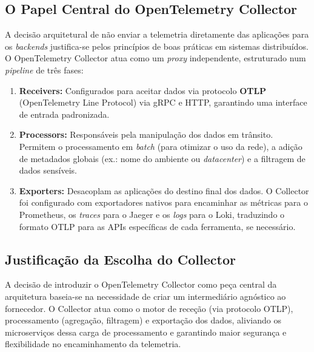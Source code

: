 \documentclass[a4paper,12pt,oneside]{article}
\begin{document}
    \subsection{O Papel Central do OpenTelemetry Collector}
        A decisão arquitetural de não enviar a telemetria diretamente das aplicações para os \textit{backends} justifica-se pelos princípios de boas práticas em sistemas distribuídos. O OpenTelemetry Collector atua como um \textit{proxy} independente, estruturado num \textit{pipeline} de três fases:
        \begin{enumerate}
            \item \textbf{Receivers:} Configurados para aceitar dados via protocolo \textbf{OTLP} (OpenTelemetry Line Protocol) via gRPC e HTTP, garantindo uma interface de entrada padronizada.
            \item \textbf{Processors:} Responsáveis pela manipulação dos dados em trânsito. Permitem o processamento em \textit{batch} (para otimizar o uso da rede), a adição de metadados globais (ex.: nome do ambiente ou \textit{datacenter}) e a filtragem de dados sensíveis.
            \item \textbf{Exporters:} Desacoplam as aplicações do destino final dos dados. O Collector foi configurado com exportadores nativos para encaminhar as métricas para o Prometheus, os \textit{traces} para o Jaeger e os \textit{logs} para o Loki, traduzindo o formato OTLP para as APIs específicas de cada ferramenta, se necessário.
        \end{enumerate}

    \subsection{Justificação da Escolha do Collector}
        A decisão de introduzir o OpenTelemetry Collector como peça central da arquitetura baseia-se na necessidade de criar um intermediário agnóstico ao fornecedor. O Collector atua como o motor de receção (via protocolo OTLP), processamento (agregação, filtragem) e exportação dos dados, aliviando os microserviços dessa carga de processamento e garantindo maior segurança e flexibilidade no encaminhamento da telemetria.

\printbibliography
\end{document}
